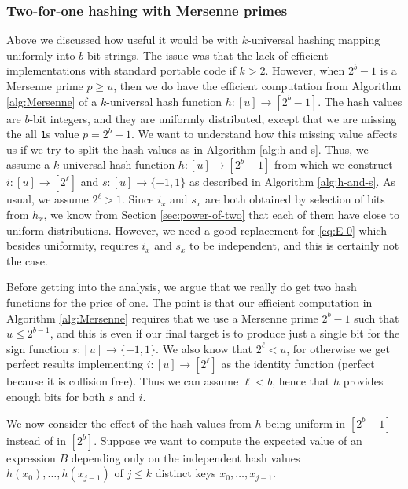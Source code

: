 \subsubsection{Two-for-one hashing with  Mersenne primes}\label{sec:two-for-one}
Above we discussed how useful it would be with $k$-universal hashing
mapping uniformly into $b$-bit strings. The issue was that the lack of
efficient implementations with standard portable code if
$k>2$. However, when $2^b-1$ is a Mersenne prime $p\geq u$, then we do
have the efficient computation from Algorithm \ref{alg:Mersenne}
of a $k$-universal hash function $h:[u]\to[2^b-1]$. The hash values
are $b$-bit integers, and they are uniformly distributed, except that
we are missing the all \texttt{1}s value $p=2^b-1$. We want to
understand how this missing value affects us if we try to split the
hash values as in Algorithm \ref{alg:h-and-s}. Thus, we assume a
$k$-universal hash function $h:[u]\to[2^b-1]$ from which we construct
$i:[u]\to[2^\ell]$ and $s:[u]\to\{-1,1\}$ as
described in Algorithm \ref{alg:h-and-s}. As usual, we assume $2^\ell>1$.
Since $i_x$ and $s_x$ are
both obtained by selection of bits from $h_x$, we know from Section
\ref{sec:power-of-two} that each of them have close to uniform
distributions. However, we need a good replacement for \eqref{eq:E-0}
which besides uniformity, requires $i_x$ and $s_x$ to be independent,
and this is certainly not the case.

Before getting into the analysis, we argue that we really do get two
hash functions for the price of one. The point is that our efficient
computation in Algorithm \ref{alg:Mersenne} requires that we use a
Mersenne prime $2^b-1$ such that $u\leq 2^{b-1}$, and this is even if
our final target is to produce just a single bit for the sign function
$s:[u]\to\{-1,1\}$. We also know that $2^\ell<u$, for otherwise we
get perfect results implementing $i:[u]\to[2^\ell]$ as the identity
function (perfect because it is collision free).  Thus we can assume
$\ell<b$, hence that $h$ provides enough bits for both $s$ and $i$.


We now consider the effect of the hash values from $h$ being uniform
in $[2^b-1]$ instead of in $[2^b]$. Suppose we want to compute the
expected value of an expression $B$ depending only on the independent
hash values $h(x_0),\ldots,h(x_{j - 1})$ of $j\leq k$ distinct keys
$x_0,\ldots,x_{j - 1}$.

